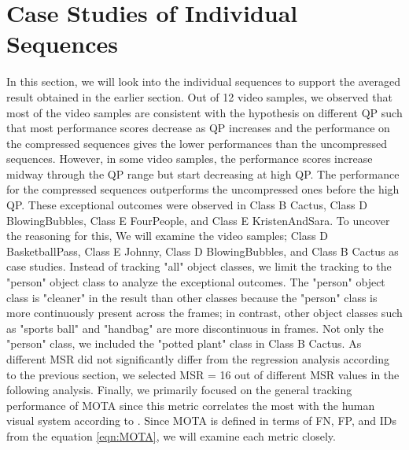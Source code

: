\section{Case Studies of Individual Sequences}
\label{sec:results/section_b}

In this section, we will look into the individual sequences to support the averaged result obtained in the earlier section. Out of 12 video samples, we observed that most of the video samples are consistent with the hypothesis on different QP such that most performance scores decrease as QP increases and the performance on the compressed sequences gives the lower performances than the uncompressed sequences. However, in some video samples, the performance scores increase midway through the QP range but start decreasing at high QP. The performance for the compressed sequences outperforms the uncompressed ones before the high QP. These exceptional outcomes were observed in Class B Cactus, Class D BlowingBubbles, Class E FourPeople, and Class E KristenAndSara. To uncover the reasoning for this, We will examine the video samples; Class D BasketballPass, Class E Johnny, Class D BlowingBubbles, and Class B Cactus as case studies. Instead of tracking "all" object classes, we limit the tracking to the "person" object class to analyze the exceptional outcomes. The "person" object class is "cleaner" in the result than other classes because the "person" class is more continuously present across the frames; in contrast, other object classes such as "sports ball" and "handbag" are more discontinuous in frames. Not only the "person" class, we included the "potted plant" class in Class B Cactus. As different MSR did not significantly differ from the regression analysis according to the previous section, we selected MSR = 16 out of different MSR values in the following analysis. Finally, we primarily focused on the general tracking performance of MOTA since this metric correlates the most with the human visual system according to \cite{leal-taixe_motchallenge_2015}. Since MOTA is defined in terms of FN, FP, and IDs from the equation \ref{eqn:MOTA}, we will examine each metric closely.  


